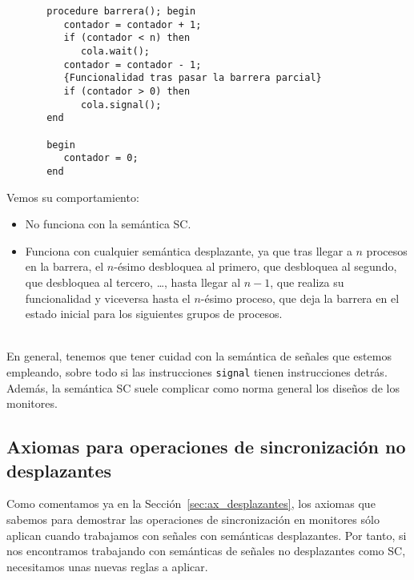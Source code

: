 \begin{ejemplo}
\begin{verbatim}
       procedure barrera(); begin
          contador = contador + 1;
          if (contador < n) then
             cola.wait();
          contador = contador - 1;
          {Funcionalidad tras pasar la barrera parcial}
          if (contador > 0) then
             cola.signal();
       end

       begin
          contador = 0;
       end
\end{verbatim}
Vemos su comportamiento:
\begin{itemize}
    \item No funciona con la semántica SC.
    \item Funciona con cualquier semántica desplazante, ya que tras llegar a $n$ procesos en la barrera, el $n$-ésimo desbloquea al primero, que desbloquea al segundo, que desbloquea al tercero, \ldots, hasta llegar al $n-1$, que realiza su funcionalidad y viceversa hasta el $n$-ésimo proceso, que deja la barrera en el estado inicial para los siguientes grupos de procesos.
\end{itemize}
\end{ejemplo}~\\

En general, tenemos que tener cuidad con la semántica de señales que estemos empleando, sobre todo si las instrucciones \verb|signal| tienen instrucciones detrás. Además, la semántica SC suele complicar como norma general los diseños de los monitores.

\subsection{Axiomas para operaciones de sincronización no desplazantes}
Como comentamos ya en la Sección~\ref{sec:ax_desplazantes}, los axiomas que sabemos para demostrar las operaciones de sincronización en monitores sólo aplican cuando trabajamos con señales con semánticas desplazantes. Por tanto, si nos encontramos trabajando con semánticas de señales no desplazantes como SC, necesitamos unas nuevas reglas a aplicar.

